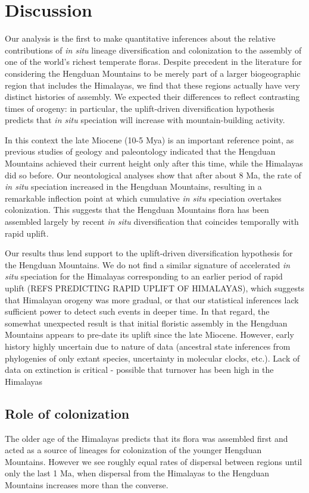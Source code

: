 \section{Discussion}

Our analysis is the first to make quantitative inferences about the relative contributions of \textit{in situ} lineage diversification and colonization to the assembly of one of the world's richest temperate floras. Despite precedent in the literature for considering the Hengduan Mountains to be merely part of a larger biogeographic region that includes the Himalayas, we find that these regions actually have very distinct histories of assembly. We expected their differences to reflect contrasting times of orogeny: in particular, the uplift-driven diversification hypothesis predicts that \textit{in situ} speciation will increase with mountain-building activity.

In this context the late Miocene (10-5 Mya) is an important reference point, as previous studies of geology and paleontology indicated that the Hengduan Mountains achieved their current height only after this time, while the Himalayas did so before. Our neontological analyses show that after about 8 Ma, the rate of \textit{in situ} speciation increased in the Hengduan Mountains, resulting in a remarkable inflection point at which cumulative \textit{in situ} speciation overtakes colonization. This suggests that the Hengduan Mountains flora has been assembled largely by recent \textit{in situ} diversification that coincides temporally with rapid uplift.

Our results thus lend support to the uplift-driven diversification hypothesis for the Hengduan Mountains. We do not find a similar signature of accelerated \textit{in situ} speciation for the Himalayas corresponding to an earlier period of rapid uplift (REFS PREDICTING RAPID UPLIFT OF HIMALAYAS), which suggests that Himalayan orogeny was more gradual, or that our statistical inferences lack sufficient power to detect such events in deeper time. In that regard, the somewhat unexpected result is that initial floristic assembly in the Hengduan Mountains appears to pre-date its uplift since the late Miocene. However, early history highly uncertain due to nature of data (ancestral state inferences from phylogenies of only extant species, uncertainty in molecular clocks, etc.). Lack of data on extinction is critical - possible that turnover has been high in the Himalayas

\subsection{Role of colonization}
The older age of the Himalayas predicts that its flora was assembled first and acted as a source of lineages for colonization of the younger Hengduan Mountains. However we see roughly equal rates of dispersal between regions until only the last 1 Ma, when dispersal from the Himalayas to the Hengduan Mountains increases more than the converse. 



